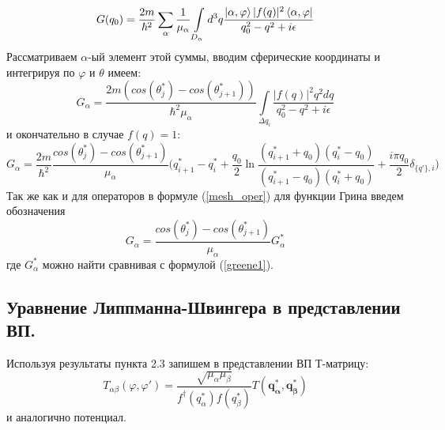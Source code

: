 \documentclass[a4paper,12pt]{article}
\newcommand{\vect}[1]{\boldsymbol{#1}}
\begin{document}
\[
  G(q_0) = 
	\frac{2m}{\hbar^2}  \sum\limits_\alpha \frac{1}{ \mu_\alpha } \int\limits_{D_\alpha} d^3q 
		\frac{ \ket{\alpha,\varphi} |f(q)|^2 \bra{\alpha,\varphi} }{ q_0^2 - q^2 + i\epsilon } 
\]
Рассматриваем $\alpha$-ый элемент этой суммы, вводим сферические координаты и интегрируя по $\varphi$ и $\theta$ имеем:
\[
  G_\alpha = \frac{2m (cos(\theta_j^*)-cos(\theta_{j+1}^*))}{\hbar^2 \mu_\alpha} \int\limits_{\Delta q_i}
		\frac{ |f(q)|^2 q^2 dq }{ q_0^2 - q^2 + i\epsilon } 
\]
и окончательно в случае $f(q)=1$:
\begin{equation}
  \label{greene1}
  G_\alpha = \frac{2m}{\hbar^2} \frac{cos(\theta_j^*)-cos(\theta_{j+1}^*)}{\mu_\alpha}
		\bigg( 
			q_{i+1}^* - q_i^* + \frac{q_0}{2}\ln\frac{(q_{i+1}^* +q_0)(q_i^* -q_0)}{(q_{i+1}^* -q_0)(q_i^* +q_0)} + \frac{i\pi q_0}{2}\delta_{\{q'\},i}
		\bigg)
\end{equation}
Так же как и для операторов в формуле (\ref{mesh_oper}) для функции Грина введем обозначения
\begin{equation}
    \label{mesh_greene}
    G_\alpha = \frac{cos(\theta_j^*)-cos(\theta_{j+1}^*)}{\mu_\alpha} G^*_\alpha
\end{equation} где $G^*_\alpha$ можно найти сравнивая с формулой (\ref{greene1}). %

\newline
\subsection{Уравнение Липпманна-Швингера в представлении ВП.}

Используя результаты пункта 2.3 запишем в представлении ВП Т-матрицу:
\begin{equation}
	T_{\alpha\beta}(\varphi,\varphi') = \frac{\sqrt{\mu_\alpha \mu_\beta}}{ f^\dagger(q_\alpha^*)f(q_\beta^*) } T(\vect{q^*_\alpha},\vect{q^*_\beta})
\end{equation}
и аналогично потенциал.
\end{document}
